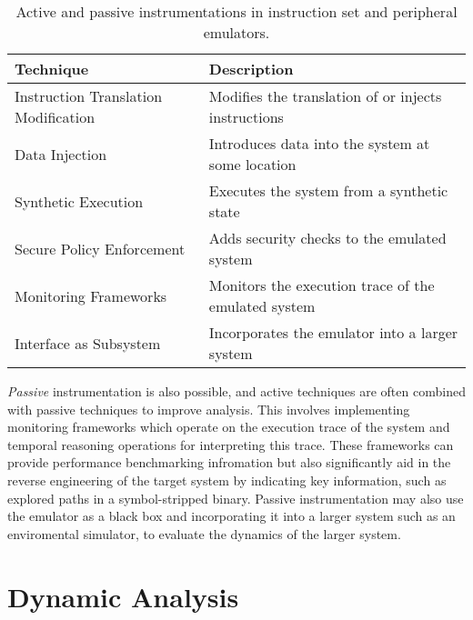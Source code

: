 \begin{table}[h]
\centering
\begin{tabular}{|l|l|}
\hline
\textbf{Technique} & \textbf{Description} \\ \hline
\multirow{2}{*}{Instruction Translation Modification} & \multirow{2}{*}{Modifies the translation of or injects instructions} \\
 & \\ \hline
\multirow{2}{*}{Data Injection} & \multirow{2}{*}{Introduces data into the system at some location} \\
 & \\ \hline
\multirow{2}{*}{Synthetic Execution} & \multirow{2}{*}{Executes the system from a synthetic state} \\
 & \\ \hline
\multirow{2}{*}{Secure Policy Enforcement} & \multirow{2}{*}{Adds security checks to the emulated system} \\
 & \\ \hline
\multirow{2}{*}{Monitoring Frameworks} & \multirow{2}{*}{Monitors the execution trace of the emulated system} \\
 & \\ \hline
\multirow{2}{*}{Interface as Subsystem} & \multirow{2}{*}{Incorporates the emulator into a larger system} \\
 & \\ \hline
\end{tabular}
\caption{Active and passive instrumentations in instruction set and peripheral emulators.}
\label{tab:instruments}
\end{table}

\emph{Passive} instrumentation is also possible, and active techniques are often combined with passive techniques to improve analysis.
This involves implementing monitoring frameworks which operate on the execution trace of the system and temporal reasoning operations for interpreting this trace.
These frameworks can provide performance benchmarking infromation but also significantly aid in the reverse engineering of the target system by indicating key information, such as explored paths in a symbol-stripped binary.
Passive instrumentation may also use the emulator as a black box and incorporating it into a larger system such as an enviromental simulator, to evaluate the dynamics of the larger system.

\section{Dynamic Analysis}



